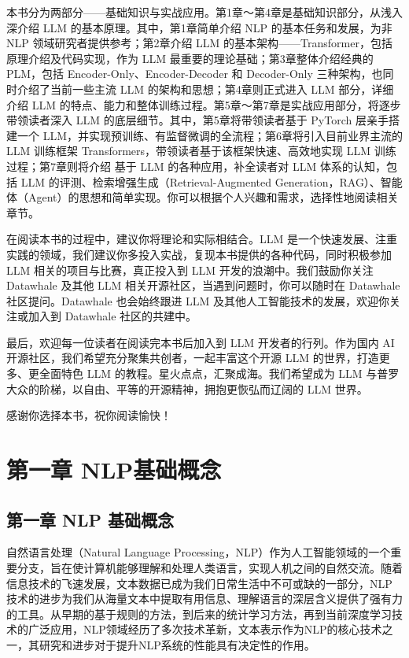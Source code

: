 \documentclass[12pt,a4paper]{book}
\begin{document}
本书分为两部分------基础知识与实战应用。第1章～第4章是基础知识部分，从浅入深介绍
LLM 的基本原理。其中，第1章简单介绍 NLP 的基本任务和发展，为非 NLP
领域研究者提供参考；第2章介绍 LLM
的基本架构------Transformer，包括原理介绍及代码实现，作为 LLM
最重要的理论基础；第3章整体介绍经典的 PLM，包括
Encoder-Only、Encoder-Decoder 和 Decoder-Only
三种架构，也同时介绍了当前一些主流 LLM 的架构和思想；第4章则正式进入 LLM
部分，详细介绍 LLM
的特点、能力和整体训练过程。第5章～第7章是实战应用部分，将逐步带领读者深入
LLM 的底层细节。其中，第5章将带领读者基于 PyTorch 层亲手搭建一个
LLM，并实现预训练、有监督微调的全流程；第6章将引入目前业界主流的 LLM
训练框架 Transformers，带领读者基于该框架快速、高效地实现 LLM
训练过程；第7章则将介绍 基于 LLM 的各种应用，补全读者对 LLM
体系的认知，包括 LLM 的评测、检索增强生成（Retrieval-Augmented
Generation，RAG）、智能体（Agent）的思想和简单实现。你可以根据个人兴趣和需求，选择性地阅读相关章节。

在阅读本书的过程中，建议你将理论和实际相结合。LLM
是一个快速发展、注重实践的领域，我们建议你多投入实战，复现本书提供的各种代码，同时积极参加
LLM 相关的项目与比赛，真正投入到 LLM 开发的浪潮中。我们鼓励你关注
Datawhale 及其他 LLM 相关开源社区，当遇到问题时，你可以随时在 Datawhale
社区提问。Datawhale 也会始终跟进 LLM
及其他人工智能技术的发展，欢迎你关注或加入到 Datawhale 社区的共建中。

最后，欢迎每一位读者在阅读完本书后加入到 LLM 开发者的行列。作为国内 AI
开源社区，我们希望充分聚集共创者，一起丰富这个开源 LLM
的世界，打造更多、更全面特色 LLM
的教程。星火点点，汇聚成海。我们希望成为 LLM
与普罗大众的阶梯，以自由、平等的开源精神，拥抱更恢弘而辽阔的 LLM 世界。

感谢你选择本书，祝你阅读愉快！

\chapter{第一章 NLP基础概念}
{
\setcounter{tocdepth}{3}
\tableofcontents
}
\section{第一章 NLP
基础概念}\label{ux7b2cux4e00ux7ae0-nlp-ux57faux7840ux6982ux5ff5}

自然语言处理（Natural Language
Processing，NLP）作为人工智能领域的一个重要分支，旨在使计算机能够理解和处理人类语言，实现人机之间的自然交流。随着信息技术的飞速发展，文本数据已成为我们日常生活中不可或缺的一部分，NLP技术的进步为我们从海量文本中提取有用信息、理解语言的深层含义提供了强有力的工具。从早期的基于规则的方法，到后来的统计学习方法，再到当前深度学习技术的广泛应用，NLP领域经历了多次技术革新，文本表示作为NLP的核心技术之一，其研究和进步对于提升NLP系统的性能具有决定性的作用。
\end{document}
